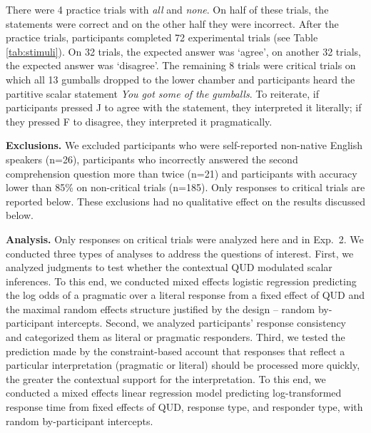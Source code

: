 \documentclass[10pt,letterpaper]{article}
\begin{document}
There were 4 practice trials with \textit{all} and \textit{none}. On half of these trials, the statements were correct and on the other half they were incorrect. After the practice trials, participants completed 72 experimental trials (see Table \ref{tab:stimuli}). On 32   trials, the expected answer was `agree', on another 32 trials, the expected answer was `disagree'. The remaining 8 trials were  critical trials on which all 13 gumballs dropped to the lower chamber and participants heard the partitive scalar statement \emph{You got some of the gumballs}. To reiterate, if participants pressed J to agree with the statement, they interpreted it literally; if they pressed F to disagree, they interpreted it pragmatically.

\noindent \textbf{Exclusions.} We excluded participants who were self-reported non-native English speakers (n=26), participants who incorrectly answered the second comprehension question more than twice (n=21) and participants with accuracy lower than 85\% on non-critical trials (n=185). Only responses to critical trials are reported below. These exclusions had no qualitative effect on the results discussed below.

 
 
\noindent \textbf{Analysis.}  Only responses on critical trials were  analyzed here and in Exp.~2. We conducted three types of analyses to address the questions of interest. First, we analyzed judgments to test whether the contextual QUD modulated scalar inferences. To this end, we conducted mixed effects logistic regression predicting the log odds of a pragmatic over a literal response from a fixed effect of QUD and the maximal random effects structure justified by the design --  random by-participant intercepts. Second, we analyzed participants' response consistency and categorized them as  literal or pragmatic responders. Third, we tested the prediction made by the constraint-based account  that responses that reflect a particular interpretation (pragmatic or literal) should be processed more quickly, the greater the contextual support for the interpretation. To this end, we conducted a mixed effects linear regression model predicting log-transformed response time from fixed effects of QUD, response type, and responder type, with random by-participant intercepts.
 
\end{document}
